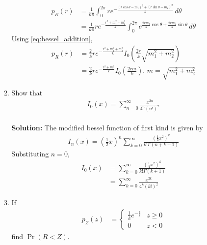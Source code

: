 \documentclass[journal,10pt,twocolumn]{IEEEtran}
\providecommand{\pr}[1]{\ensuremath{\Pr\left(#1\right)}}
\providecommand{\brak}[1]{\ensuremath{\left(#1\right)}}
\newcommand{\solution}{\noindent \textbf{Solution: }}
\begin{document}
\begin{enumerate}
\begin{enumerate}[label=(\alph{enumii})]
\begin{align}
	p_{R}\brak{r} &= \frac{1}{k\pi} \int_{0}^{2\pi} re^{-\frac{\brak{r\cos \theta-m_1}^2+\brak{r\sin \theta-m_2}^2}{k}} \,d\theta\\ 
	&= \frac{1}{k\pi}re^{-\frac{r^2+m_1^2+m_2^2}{k}} \int_{0}^{2\pi} e^{\frac{2r m_1}{k}\cos \theta + \frac{2r m_2}{k}\sin \theta} \,d\theta
\end{align}
Using \eqref{eq:bessel_addition},
\begin{align}
	p_{R}\brak{r} &= \frac{2}{k}re^{-\frac{r^2+m_1^2+m_2^2}{k}}I_{0}\brak{\frac{2r}{k}\sqrt{m_1^2+m_2^2}}\\
	&= \frac{2}{k}re^{-\frac{r^2+m^2}{k}}I_{0}\brak{\frac{2rm}{k}} \text{, $m=\sqrt{m_1^2+m_2^2}$}
\end{align}
%
\item
Show that
\begin{align}
I_0(x) = \sum_{n=0}^{\infty}\frac{x^{2n}}{4^n\brak{n!}^2}
\end{align}\\
\solution The modified bessel function of first kind is given by
\begin{align}
	\label{eq:mod_bessel_eq_series}
	I_{n}\brak{x} = \brak{\frac{1}{2}x}^n \sum_{k=0}^{\infty} \frac{\brak{\frac{1}{4}x^2}^k}{k!\Gamma\brak{n+k+1}}
\end{align}
Substituting $n=0$,
\begin{align}
	I_{0}\brak{x} &= \sum_{k=0}^{\infty} \frac{\brak{\frac{1}{4}x^2}^k}{k!\Gamma\brak{k+1}}\\
	&= \sum_{k=0}^{\infty} \frac{x^{2k}}{4^k\brak{k!}^2}
\end{align}
\item 
If
%
\begin{align}
p_{Z}(z) &= 
\begin{cases}
\frac{1}{k} e^{-\frac{z}{k}} & z \geq 0 \\
0 & z < 0
\end{cases}
\end{align}
%
find $\pr{R < Z}$.
\end{enumerate}
\end{enumerate}
\end{document}
